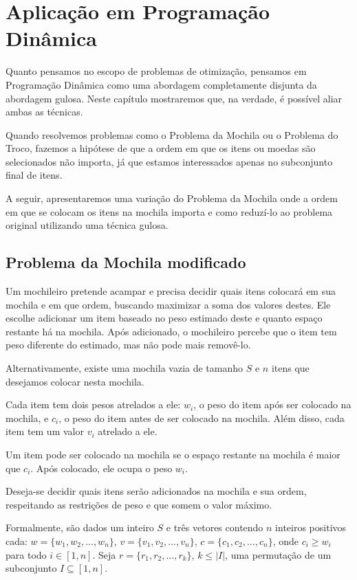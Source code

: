 \chapter{Aplicação em Programação Dinâmica}
\label{pd}

Quanto pensamos no escopo de problemas de otimização, pensamos em Programação Dinâmica como uma abordagem completamente disjunta da abordagem gulosa. Neste capítulo mostraremos que, na verdade, é possível aliar ambas as técnicas.

Quando resolvemos problemas como o Problema da Mochila ou o Problema do Troco, fazemos a hipótese de que a ordem em que os itens ou moedas são selecionados não importa, já que estamos interessados apenas no subconjunto final de itens.

A seguir, apresentaremos uma variação do Problema da Mochila onde a ordem em que se colocam os itens na mochila importa e como reduzí-lo ao problema original utilizando uma técnica gulosa.

\section{Problema da Mochila modificado}

Um mochileiro pretende acampar e precisa decidir quais itens colocará em sua mochila e em que ordem, buscando maximizar a soma dos valores destes. Ele escolhe adicionar um item baseado no peso estimado deste e quanto espaço restante há na mochila. Após adicionado, o mochileiro percebe que o item tem peso diferente do estimado, mas não pode mais removê-lo.

Alternativamente, existe uma mochila vazia de tamanho $S$ e $n$ itens que desejamos colocar nesta mochila.

Cada item tem dois pesos atrelados a ele: $w_i$, o peso do item após ser colocado na mochila, e $c_i$, o peso do item antes de ser colocado na mochila. Além disso, cada item tem um valor $v_i$ atrelado a ele.

Um item pode ser colocado na mochila se o espaço restante na mochila é maior que $c_i$. Após colocado, ele ocupa o peso $w_i$.

Deseja-se decidir quais itens serão adicionados na mochila e sua ordem, respeitando as restrições de peso e que somem o valor máximo.

Formalmente, são dados um inteiro $S$ e três vetores contendo $n$ inteiros positivos cada: $w = \{w_1, w_2, ..., w_n\}$, $v = \{v_1, v_2, ..., v_n\}$, $c = \{c_1, c_2, ..., c_n\}$, onde $c_i \geq w_i$ para todo $i \in [1, n]$. Seja $r = \{r_1, r_2, ..., r_k\}$, $k \leq |I|$, uma permutação de um subconjunto $I \subseteq [1, n]$. 

